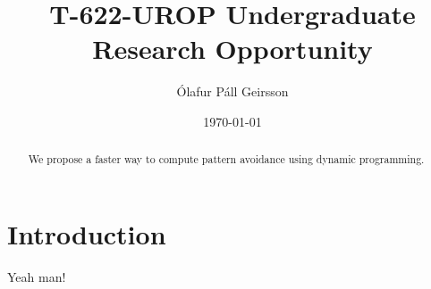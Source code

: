 \documentclass[oneside,11pt,paper]{memoir}
\theoremstyle{remark}
\begin{document}

\title{T-622-UROP Undergraduate Research Opportunity}
\author{Ólafur Páll Geirsson}
\date{\today}


\maketitle
\thispagestyle{empty}


\begin{abstract}
    We propose a faster way to compute pattern avoidance using dynamic programming.
\end{abstract}

\section*{Introduction}
Yeah man!
\end{document}
